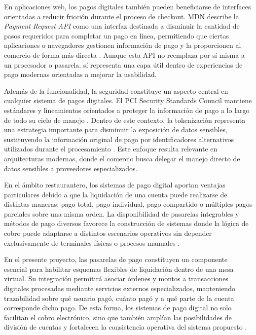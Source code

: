 \documentclass[12pt]{report}
\begin{document}
En aplicaciones web, los pagos digitales también pueden beneficiarse de interfaces orientadas a reducir fricción durante el proceso de checkout. MDN describe la \textit{Payment Request API} como una interfaz destinada a disminuir la cantidad de pasos requeridos para completar un pago en línea, permitiendo que ciertas aplicaciones o navegadores gestionen información de pago y la proporcionen al comercio de forma más directa \cite{mdn_payment_request_api_2025,mdn_payment_request_using_2025}. Aunque esta API no reemplaza por sí misma a un procesador o pasarela, sí representa una capa útil dentro de experiencias de pago modernas orientadas a mejorar la usabilidad.

Además de la funcionalidad, la seguridad constituye un aspecto central en cualquier sistema de pagos digitales. El PCI Security Standards Council mantiene estándares y lineamientos orientados a proteger la información de pago a lo largo de todo su ciclo de manejo \cite{pci_security_standards_overview_2026,pci_document_library_2026}. Dentro de este contexto, la tokenización representa una estrategia importante para disminuir la exposición de datos sensibles, sustituyendo la información original de pago por identificadores alternativos utilizados durante el procesamiento \cite{pci_tsp_standard_2026}. Este enfoque resulta relevante en arquitecturas modernas, donde el comercio busca delegar el manejo directo de datos sensibles a proveedores especializados.

En el ámbito restaurantero, los sistemas de pago digital aportan ventajas particulares debido a que la liquidación de una cuenta puede realizarse de distintas maneras: pago total, pago individual, pago compartido o múltiples pagos parciales sobre una misma orden. La disponibilidad de pasarelas integrables y métodos de pago diversos favorece la construcción de sistemas donde la lógica de cobro puede adaptarse a distintos escenarios operativos sin depender exclusivamente de terminales físicas o procesos manuales \cite{stripe_payments_docs_2026,mercadopago_docs_2026}.

En el presente proyecto, las pasarelas de pago constituyen un componente esencial para habilitar esquemas flexibles de liquidación dentro de una mesa virtual. Su integración permitirá asociar órdenes y montos a transacciones digitales procesadas mediante servicios externos especializados, manteniendo trazabilidad sobre qué usuario pagó, cuánto pagó y a qué parte de la cuenta corresponde dicho pago. De esta forma, los sistemas de pago digital no solo facilitan el cobro electrónico, sino que también amplían las posibilidades de división de cuentas y fortalecen la consistencia operativa del sistema propuesto \cite{stripe_payments_docs_2026,mercadopago_docs_2026,pci_security_standards_overview_2026}.
\end{document}
